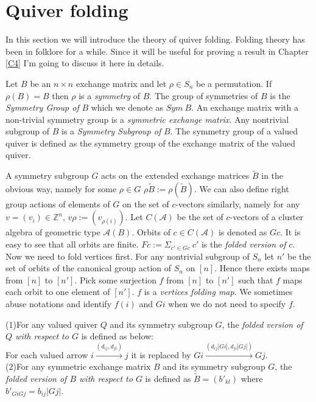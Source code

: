 \section{Quiver folding}
\indent In this section we will introduce the theory of quiver folding. Folding theory has been in folklore for a while. Since it will be useful for proving a result in Chapter \ref{C4} I'm going to discuss it here in details.\\
\begin{definition}
Let $B$ be an $n\times n$ exchange matrix and let $\rho\in S_n$ be a permutation. If $\rho(B)=B$ then $\rho$ is a \textit{symmetry} of $B$. The group of symmetries of $B$ is the \textit{Symmetry Group of} $B$ which we denote as $Sym\ B$. An exchange matrix with a non-trivial symmetry group is a \textit{symmetric exchange matrix}. Any nontrivial subgroup of $B$ is a \textit{Symmetry Subgroup of} $B$. The symmetry group of a valued quiver is defined as the symmetry group of the exchange matrix of the valued quiver.\\   
\end{definition}
\indent A symmetry subgroup $G$ acts on the extended exchange matrices $\tilde{B}$ in the obvious way, namely for some $\rho\in G$ $\rho \tilde{B}:=\rho(\tilde{B})$. We can also define right group actions of elements of $G$ on the set of $c$-vectors similarly, namely for any $v=(v_i)\in \mathbb{Z}^n$, $v\rho:=(v_{\rho(i)})$. Let $C(\mathcal{A})$ be the set of $c$-vectors of a cluster algebra of geometric type $\mathcal{A}(B)$. Orbits of $c\in C(\mathcal{A})$ is denoted as $Gc$. It is easy to see that all orbits are finite. $Fc := \Sigma_{c'\in Gc}\ c'$ is the \textit{folded version of} $c$.\\
\indent Now we need to fold vertices first. For any nontrivial subgroup of $S_n$ let $n'$ be the set of orbits of the canonical group action of $S_n$ on $[n]$. Hence there exists maps from $[n]$ to $[n']$. Pick some surjection $f$ from $[n]$ to $[n']$ such that $f$ maps each orbit to one element of $[n']$. $f$ is a \textit{vertices folding map}. We sometimes abuse notations and identify $f(i)$ and $Gi$ when we do not need to specify $f$.\\
\begin{definition}
(1)For any valued quiver $Q$ and its symmetry subgroup $G$, the \textit{folded version of $Q$ with respect to $G$} is defined as below:\\
For each valued arrow $i\overset{(d_{ij},d_{ji})}{\longrightarrow} j$ it is replaced by $Gi\overset{(d_{ij}|Gi|,d_{ji}|Gj|)}{\longrightarrow} Gj$.\\
(2)For any symmetric exchange matrix $B$ and its symmetry subgroup $G$, the \textit{folded version of $B$ with respect to $G$} is defined as $\tilde{B}=(b'_{kl})$ where $b'_{GiGj}=b_{ij}|Gj|$. \\ \cite{Sal14}\cite{BHIT15}\\
\end{definition}
